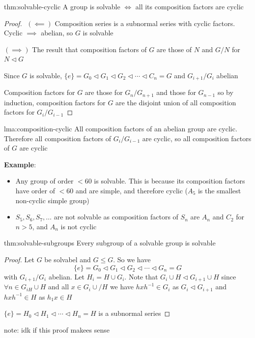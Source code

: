 \documentclass{article}
\begin{document}
\begin{thm}{thm:solvable-cyclic}{}
    A group is solvable $\iff$ all its composition factors are cyclic
\end{thm}

\begin{proof}
    $ $\newline
    $(\impliedby)$ Composition series is a subnormal series with cyclic factors. Cyclic $\implies$ abelian, so $G$ is solvable

    $(\implies)$ The result that composition factors of $G$ are those of $N$ and $G /N$ for $N \lhd G$

    Since $G$ is solvable, $\{e\} = G_{0} \lhd G_{1} \lhd G_{2} \lhd \cdots \lhd C_{n} = G$ and $G_{i+1} /G_{i}$ abelian

    Composition factors for $G$ are those for $G_{n} /G_{n+1}$ and those for $G_{n-1}$ so by induction, composition factors for $G$ are the disjoint union of all composition factors for $G_{i} /G_{i-1}$
\end{proof}

\begin{lma}[]{lma:composition-cyclic}{}
    All composition factors of an abelian group are cyclic. Therefore all composition factors of $G_{i} /G_{i-1}$ are cyclic, so all composition factors of $G$ are cyclic
\end{lma}

\textbf{Example}: 
\begin{itemize}
    \item Any group of order $<60$ is solvable. This is because its composition factors have order of $<60$ and are simple, and therefore cyclic ($A_{5}$ is the smallest non-cyclic simple group)
    \item $S_{5},S_{6},S_{7},\dots$ are not solvable as composition factors of $S_{n}$ are $A_{n}$ and $C_{2}$ for $n>5$, and $A_{n}$ is not cyclic
\end{itemize}

\begin{thm}{thm:solvable-subgroups}{}
    Every subgroup of a solvable group is solvable
\end{thm}

\begin{proof}
    Let $G$ be solvabel and $G \le G$. So we have
    \[\{e\} = G_{0} \lhd G_{1} \lhd G_{2} \lhd \cdots \lhd G_{n} = G\]
    with $G_{i+1} / G_{i}$ abelian. Let $H_{i} = H \cup G_{i}$. Note that $G_{i} \cup H \lhd G_{i+1} \cup H$ since $\forall n \in G_{iH} \cup H$ and all $x\in G_{i} \cup / H$ we have $hxh^{-1}\in G_{i}$ as $G_{i} \lhd G_{i+1}$ and $hxh^{-1} \in H$ as $h_{1}x\in H$

    $\{e\} = H_{0} \lhd H_{1} \lhd \cdots \lhd H_{n} = H$ is a subnormal series
\end{proof}

note: idk if this proof makees sense
\end{document}
